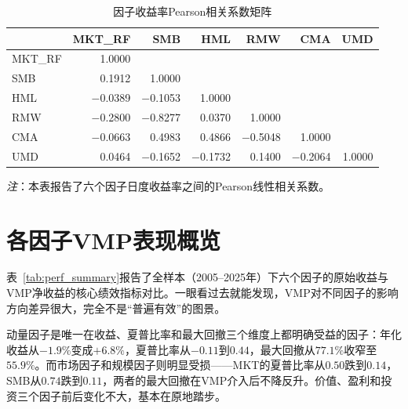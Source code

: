 \documentclass[
    decl-page,
    oneside,
  ]{njuthesis}
\begin{document}
\begin{table}[htbp]
\centering
\caption{因子收益率Pearson相关系数矩阵}
\label{tab:corr_matrix}
\small
\begin{tabular}{l*{6}{r}}
\toprule
 & MKT\_RF & SMB & HML & RMW & CMA & UMD \\
\midrule
MKT\_RF & 1.0000 &  &  &  &  &  \\
SMB & 0.1912 & 1.0000 &  &  &  &  \\
HML & $-$0.0389 & $-$0.1053 & 1.0000 &  &  &  \\
RMW & $-$0.2800 & $-$0.8277 & 0.0370 & 1.0000 &  &  \\
CMA & $-$0.0663 & 0.4983 & 0.4866 & $-$0.5048 & 1.0000 &  \\
UMD & 0.0464 & $-$0.1652 & $-$0.1732 & 0.1400 & $-$0.2064 & 1.0000 \\
\bottomrule
\end{tabular}

\vspace{0.5em}
\begin{minipage}{0.95\textwidth}
\footnotesize
\textit{注}：本表报告了六个因子日度收益率之间的Pearson线性相关系数。
\end{minipage}
\end{table}

\section{各因子VMP表现概览}

表~\ref{tab:perf_summary}报告了全样本（2005--2025年）下六个因子的原始收益与VMP净收益的核心绩效指标对比。一眼看过去就能发现，VMP对不同因子的影响方向差异很大，完全不是“普遍有效”的图景。

动量因子是唯一在收益、夏普比率和最大回撤三个维度上都明确受益的因子：年化收益从$-1.9\%$变成$+6.8\%$，夏普比率从$-0.11$到$0.44$，最大回撤从$77.1\%$收窄至$55.9\%$。而市场因子和规模因子则明显受损——MKT的夏普比率从$0.50$跌到$0.14$，SMB从$0.74$跌到$0.11$，两者的最大回撤在VMP介入后不降反升。价值、盈利和投资三个因子前后变化不大，基本在原地踏步。
\end{document}

